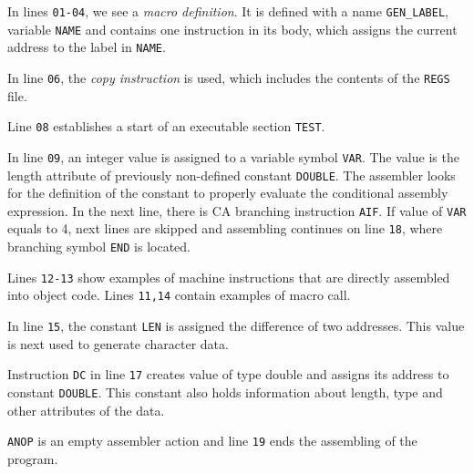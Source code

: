 In lines \verb|01-04|, we see a \emph{macro definition}. It is defined with a name \verb|GEN_LABEL|, variable \verb|NAME| and contains one instruction in its body, which assigns the current address to the label in \verb|NAME|.

In line \verb|06|, the \emph{copy instruction} is used, which includes the contents of the \verb|REGS| file.

Line \verb|08| establishes a start of an executable section \verb|TEST|. 

In line \verb|09|, an integer value is assigned to a variable symbol \verb|VAR|. The value is the length attribute of previously non-defined constant \verb|DOUBLE|. The assembler looks for the definition of the constant to properly evaluate the conditional assembly expression. In the next line, there is CA branching instruction \verb|AIF|. If value of \verb|VAR| equals to 4, next lines are skipped and assembling continues on line \verb|18|, where branching symbol \verb|END| is located.  

Lines \verb|12-13| show examples of machine instructions that are directly assembled into object code. Lines \verb|11,14| contain examples of macro call.

In line \verb|15|, the constant \verb|LEN| is assigned the difference of two addresses. This value is next used to generate character data.

Instruction \verb|DC| in line \verb|17| creates value of type double and assigns its address to constant \verb|DOUBLE|. This constant also holds information about length, type and other attributes of the data.  

\verb|ANOP| is an empty assembler action and line \verb|19| ends the assembling of the program. 